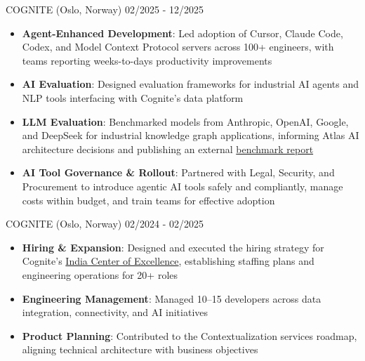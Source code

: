 \documentclass[singlesided,
               paper=a4,
               fontsize=10pt
              ]{my-resume}
\begin{document}
	{COGNITE (Oslo, Norway)}
    {02/2025 - 12/2025}
    {
        \begin{itemize}[leftmargin=2em]
            \item \textbf{Agent-Enhanced Development}: Led adoption of Cursor, Claude Code, Codex, and Model Context Protocol servers across 100+ engineers, with teams reporting weeks-to-days productivity improvements
            \item \textbf{AI Evaluation}: Designed evaluation frameworks for industrial AI agents and NLP tools interfacing with Cognite's data platform
            \item \textbf{LLM Evaluation}: Benchmarked models from Anthropic, OpenAI, Google, and DeepSeek for industrial knowledge graph applications, informing Atlas AI architecture decisions and publishing an external \href{https://www.cognite.com/en/resources/white-papers/atlas-ai-slm-llm-benchmark-report}{benchmark report}
            \item \textbf{AI Tool Governance \& Rollout}: Partnered with Legal, Security, and Procurement to introduce agentic AI tools safely and compliantly, manage costs within budget, and train teams for effective adoption
        \end{itemize}

    }
%    
	{COGNITE (Oslo, Norway)}
    {02/2024 - 02/2025}
    {
        \begin{itemize}[leftmargin=2em]
            \item \textbf{Hiring \& Expansion}: Designed and executed the hiring strategy for Cognite's \href{https://www.cognite.com/en/company/newsroom/cognite-inaugurates-india-center-of-excellence-in-bengaluru-with-commitment-to-leveraging-ai-for-industrial-growth}{India Center of Excellence}, establishing staffing plans and engineering operations for 20+ roles
            \item \textbf{Engineering Management}: Managed 10--15 developers across data integration, connectivity, and AI initiatives
            \item \textbf{Product Planning}: Contributed to the Contextualization services roadmap, aligning technical architecture with business objectives
        \end{itemize}
    }
\end{document}
